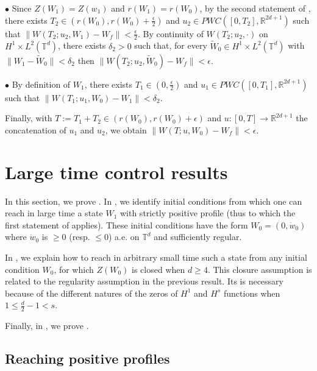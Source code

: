 \documentclass[a4paper]{article}
\theoremstyle{plain}
\newcommand{\T}{\mathbb{T}}
\newcommand{\R}{\mathbb{R}}
\begin{document}
\noindent $\bullet$ Since $Z(W_1)=Z(w_1)$ and $r(W_1)=r(W_0)$,
by the second statement of , there exists $T_2 \in (r(W_0),r(W_0)+\frac{\epsilon}{2})$ and $u_2 \in PWC([0,T_2],\R^{2d+1})$ such that $\|W(T_2;u_2,W_1)-W_f\|<\frac{\epsilon}{2}$. By continuity of $W(T_2;u_2,\cdot)$ on $H^1 \times L^2(\T^d)$, there exists $\delta_2>0$ such that, for every $\widetilde{W}_0 \in H^1 \times L^2(\T^d)$ with $\|W_1-\widetilde{W}_0\|<\delta_2$ then $\| W(T_2;u_2,\widetilde{W}_0)-W_f\|<\epsilon$.

\medskip

\noindent $\bullet$ By definition of $W_1$, there exists $T_1 \in (0,\frac{\epsilon}{2})$ and $u_1 \in PWC([0,T_1],\R^{2d+1})$ such that \newline$\|W(T_1;u_1,W_0)-W_1\|<\delta_2$. 

\medskip

Finally, with $T:=T_1+T_2 \in (r(W_0),r(W_0)+\epsilon)$ and $u:[0,T] \to \R^{2d+1}$ the concatenation of $u_1$ and $u_2$, we obtain $\|W(T;u,W_0)-W_f\|<\epsilon$.





\section{Large time control results}
\label{sec:Large_time}

In this section, we prove . In , we identify initial conditions from which one can reach in large time a state $W_1$ with strictly positive profile (thus to which the first statement of  applies). These initial conditions have the form $W_0=(0,\dot{w}_0)$ where $\dot{w}_0$ is $\geq 0$ (resp. $\leq 0$) a.e. on $\T^d$ and sufficiently regular.

In , we explain how to reach in arbitrary small time such a state from any initial condition $W_0$, for which $Z(W_0)$ is closed when $d \geq 4$. This closure assumption is related to the regularity assumption in the previous result. Its is necessary because of the different natures of the zeros of $H^1$ and $H^s$ functions when $1 \leq \frac{d}{2}-1<s$.

Finally, in , we prove .

\subsection{Reaching positive profiles}
\label{subsec:LT1}
\end{document}
